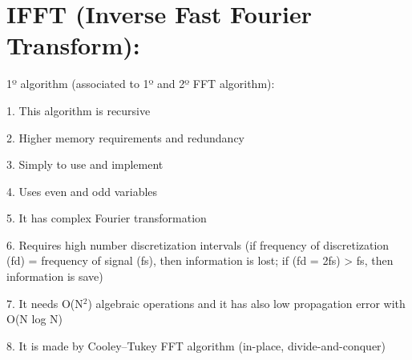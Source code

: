 \documentclass[12pt,a4paper,openany]{article}
\begin{document}
\section{IFFT (Inverse Fast Fourier Transform):}

\hspace{1cm}
1º algorithm (associated to 1º and 2º FFT algorithm):


1.	This algorithm is recursive


2.	Higher memory requirements and redundancy


3.	Simply to use and implement


4.	Uses even and odd variables


5.	It has complex Fourier transformation


6.	Requires high number discretization intervals (if frequency of discretization (fd) = frequency of signal (fs), then information is lost; if (fd = 2fs) > fs, then information is save)


7.	It needs O(N$^{2}$) algebraic operations and it has also low propagation error with O(N log N)


8.	It is made by Cooley–Tukey FFT algorithm (in-place, divide-and-conquer)
\end{document}
